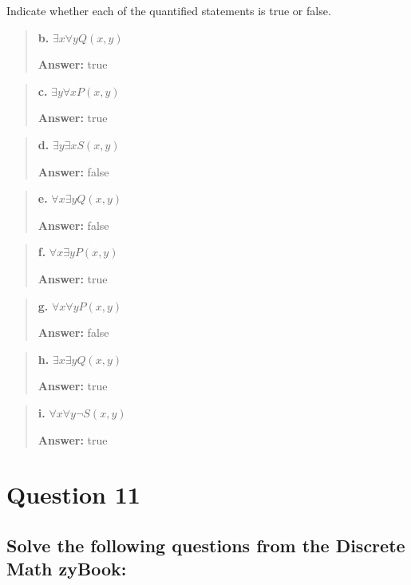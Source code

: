 \documentclass[11pt, oneside]{article}
\begin{document}
Indicate whether each of the quantified statements is true or false.

\begin{quote}
    \textbf{b. }$\exists x \forall y Q(x, y)$

    \textbf{Answer:} true
\end{quote}

\begin{quote}
    \textbf{c. }$\exists y \forall x P(x, y)$

    \textbf{Answer:} true
\end{quote}

\begin{quote}
    \textbf{d. }$\exists y \exists x S(x, y)$

    \textbf{Answer:} false
\end{quote}

\begin{quote}
    \textbf{e. }$\forall x \exists y Q(x, y)$

    \textbf{Answer:} false
\end{quote}

\begin{quote}
    \textbf{f. }$\forall x \exists y P(x, y)$

    \textbf{Answer:} true
\end{quote}

\begin{quote}
    \textbf{g. }$\forall x \forall y P(x, y)$

    \textbf{Answer:} false
\end{quote}

\begin{quote}
    \textbf{h. }$\exists x \exists y Q(x, y)$

    \textbf{Answer:} true
\end{quote}

\begin{quote}
    \textbf{i. }$\forall x \forall y \neg S(x, y)$

    \textbf{Answer:} true
\end{quote}

\pagebreak

\section*{Question 11}

\subsection*{Solve the following questions from the Discrete Math zyBook:}
\end{document}
